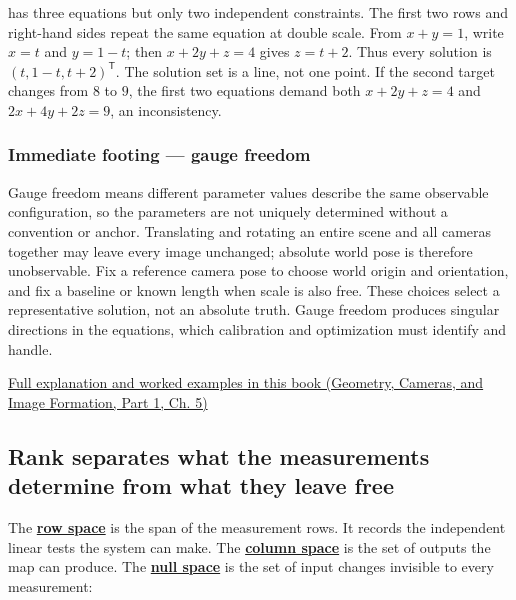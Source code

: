 has three equations but only two independent constraints. The first two rows and right-hand sides repeat the same equation at double scale. From \(x+y=1\), write \(x=t\) and \(y=1-t\); then \(x+2y+z=4\) gives \(z=t+2\). Thus every solution is \((t,1-t,t+2)^\mathsf T\). The solution set is a line, not one point. If the second target changes from \(8\) to \(9\), the first two equations demand both \(x+2y+z=4\) and \(2x+4y+2z=9\), an inconsistency.

\subsubsection{Immediate footing --- gauge freedom}\label{01-foundations-i-ch019-immediate-footing-gauge-freedom}

\hypertarget{01-foundations-i-ch019-immediate-footing-gauge-freedom}{}

Gauge freedom means different parameter values describe the same observable configuration, so the parameters are not uniquely determined without a convention or anchor. Translating and rotating an entire scene and all cameras together may leave every image unchanged; absolute world pose is therefore unobservable. Fix a reference camera pose to choose world origin and orientation, and fix a baseline or known length when scale is also free. These choices select a representative solution, not an absolute truth. Gauge freedom produces singular directions in the equations, which calibration and optimization must identify and handle.

\href{../03-Geometry-Cameras-and-Image-Formation-P01/main.pdf\#02-foundations-ii-ch036-calibration-needs-informative-observations-and-a-fixed-gauge}{Full explanation and worked examples in this book (Geometry, Cameras, and Image Formation, Part 1, Ch. 5)}

\subsection{Rank separates what the measurements determine from what they leave free}\label{01-foundations-i-ch019-rank-separates-what-the-measurements-determine-from-what-they-leave-free}

\hypertarget{01-foundations-i-ch019-rank-separates-what-the-measurements-determine-from-what-they-leave-free}{}

The \textbf{\hyperref[01-foundations-i-ch019-a-system-is-an-intersection-of-constraints]{row space}} is the span of the measurement rows. It records the independent linear tests the system can make. The \textbf{\hyperref[01-foundations-i-ch019-a-system-is-an-intersection-of-constraints]{column space}} is the set of outputs the map can produce. The \textbf{\hyperref[01-foundations-i-ch019-a-system-is-an-intersection-of-constraints]{null space}} is the set of input changes invisible to every measurement:

